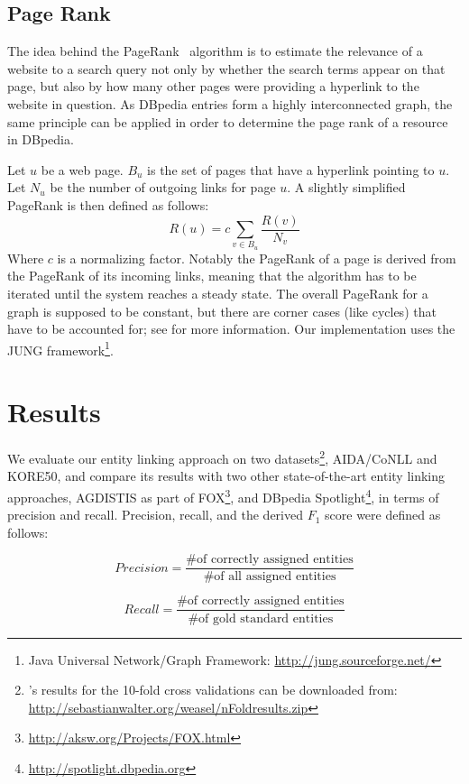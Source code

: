 \documentclass[runningheads,a4paper]{llncs}
\begin{document}
{%
\subsection{Page Rank}

The idea behind the PageRank~\cite{pageRank} algorithm is to estimate the relevance of a website to a search query not only by whether the search terms appear on that page, but also by how many other pages were providing a hyperlink to the website in question. As DBpedia entries form a highly interconnected graph, the same principle can be applied in order to determine the page rank of a resource in DBpedia.

Let $u$ be a web page. $B_u$ is the set of pages that have a hyperlink pointing to $u$. Let $N_u$ be the number of outgoing links for page $u$. A slightly simplified PageRank is then defined as follows: 
$$R(u) = c \sum_{v \in B_u} \frac{R(v)}{N_v}$$
Where $c$ is a normalizing factor. Notably the PageRank of a page is derived from the PageRank of its incoming links, meaning that the algorithm has to be iterated until the system reaches a steady state. The overall PageRank for a graph is supposed to be constant, but there are corner cases (like cycles) that have to be accounted for; see \cite{pageRank} for more information. Our implementation uses the JUNG framework\footnote{Java Universal Network/Graph Framework: \url{http://jung.sourceforge.net/}}.

\section{Results}\label{sec:results}

We evaluate our entity linking approach on two datasets\footnote{{\acronym}'s results for the 10-fold cross validations can be downloaded from: \url{http://sebastianwalter.org/weasel/nFoldresults.zip}}, AIDA/CoNLL and KORE50, and compare its results with two other state-of-the-art entity linking approaches, AGDISTIS \cite{agdistis} as part of FOX\footnote{\url{http://aksw.org/Projects/FOX.html}}, and DBpedia Spotlight\footnote{\url{http://spotlight.dbpedia.org}},  
in terms of precision and recall. Precision, recall, and the derived $F_1$ score were defined as follows:

$$Precision = \frac{\text{\# of correctly assigned entities}}{\text{\# of all assigned entities}}$$

$$Recall = \frac{\text{\# of correctly assigned entities}}{\text{\# of gold standard entities}}$$

}
\end{document}
